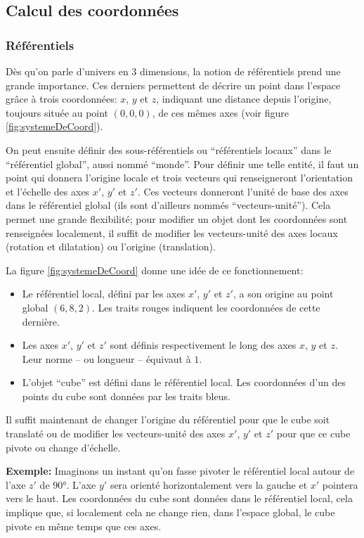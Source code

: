 \subsection{Calcul des coordonnées}
\subsubsection{Référentiels}
\label{sec:referentiels}
Dès qu'on parle d'univers en 3 dimensions, la notion de référentiels prend une grande importance. Ces derniers permettent de décrire un point dans l'espace grâce à trois coordonnées: $x$, $y$ et $z$, indiquant une distance depuis l'origine, toujours située au point $(0, 0, 0)$, de ces mêmes axes (voir figure \ref{fig:systemeDeCoord}).

On peut ensuite définir des sous-référentiels ou \enquote{référentiels locaux} dans le \enquote{référentiel global}, aussi nommé \enquote{monde}. Pour définir une telle entité, il faut un point qui donnera l'origine locale et trois vecteurs qui renseigneront l'orientation et l'échelle des axes $x'$, $y'$ et $z'$. Ces vecteurs donneront l'unité de base des axes dans le référentiel global (ils sont d'ailleurs nommés \enquote{vecteurs-unité}). Cela permet une grande flexibilité; pour modifier un objet dont les coordonnées sont renseignées localement, il suffit de modifier les vecteurs-unité des axes locaux (rotation et dilatation) ou l'origine (translation).

La figure \ref{fig:systemeDeCoord} donne une idée de ce fonctionnement:
\begin{itemize}
	\item Le référentiel local, défini par les axes $x'$, $y'$ et $z'$, a son origine au point global $(6, 8, 2)$. Les traits rouges indiquent les coordonnées de cette dernière.
	\item Les axes $x'$, $y'$ et $z'$ sont définis respectivement le long des axes $x$, $y$ et $z$. Leur norme -- ou longueur -- équivaut à $1$.
	\item L'objet \enquote{cube} est défini dans le référentiel local. Les coordonnées d'un des points du cube sont données par les traits bleus.
\end{itemize}
Il suffit maintenant de changer l'origine du référentiel pour que le cube soit translaté ou de modifier les vecteurs-unité des axes $x'$, $y'$ et $z'$ pour que ce cube pivote ou change d'échelle.

\textbf{Exemple:} Imaginons un instant qu'on fasse pivoter le référentiel local autour de l'axe $z'$ de $90\si{\degree}$. L'axe $y'$ sera orienté horizontalement vers la gauche et $x'$ pointera vers le haut. Les coordonnées du cube sont données dans le référentiel local, cela implique que, si localement cela ne change rien, dans l'espace global, le cube pivote en même temps que ces axes.

